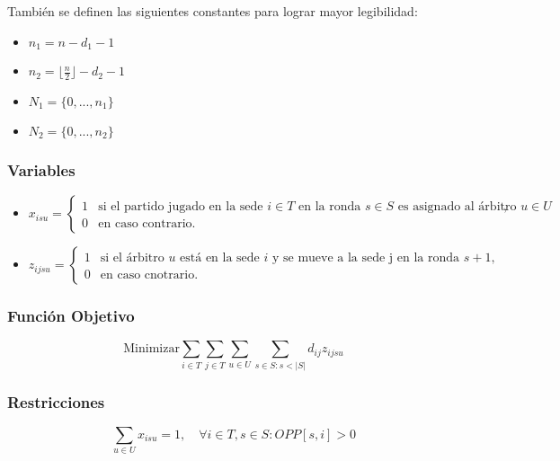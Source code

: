\documentclass[letter, 10pt]{article}
\begin{document}
Tambi\'en se definen las siguientes constantes para lograr mayor legibilidad:
\begin{itemize}
  \item $n_1 = n - d_1 - 1$
  \item $n_2 = \lfloor \frac{n}{2} \rfloor - d_2 - 1$
  \item $N_1 = \{0, ..., n_1 \}$
  \item $N_2 = \{0, ..., n_2 \}$
\end{itemize}

\subsubsection{Variables}
\begin{itemize}
  \item $x_{isu} = \begin{cases}
            1 & \text{si el partido jugado en la sede $i \in T$ en la ronda $s \in S$ es asignado al \'arbitro $u \in U$}, \\
            0 & \text{en caso contrario.}
          \end{cases}
        $
  \item $z_{ijsu} = \begin{cases}
            1 & \text{si el \'arbitro $u$ est\'a en la sede $i$ y se mueve a la sede j en la ronda $s + 1$}, \\
            0 & \text{en caso cnotrario.}
          \end{cases}
        $
\end{itemize}

\subsubsection{Funci\'on Objetivo}
\begin{equation*}
  \text{Minimizar} \displaystyle\sum_{i \in T} \displaystyle\sum_{j \in T} \displaystyle\sum_{u \in U} \displaystyle\sum_{s \in S:s < |S|} d_{ij}z_{ijsu}
\end{equation*}

\subsubsection{Restricciones}


\begin{equation} \label{1_1}
  \displaystyle\sum_{u \in U} x_{isu} = 1, \quad\forall i \in T, s \in S : OPP[s, i] > 0
\end{equation}
\end{document}
